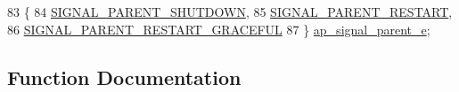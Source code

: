 \begin{DoxyCode}
83              \{
84     \hyperlink{group__APACHE__MPM__WINNT_gga5a7dd40ae0ca72d0a9dcf929d85adca0a764c7dea59a3ddb1626bac2aebe506a8}{SIGNAL\_PARENT\_SHUTDOWN},
85     \hyperlink{group__APACHE__MPM__WINNT_gga5a7dd40ae0ca72d0a9dcf929d85adca0ac6237f0eca6083d8e047fc5e2646b793}{SIGNAL\_PARENT\_RESTART},
86     \hyperlink{group__APACHE__MPM__WINNT_gga5a7dd40ae0ca72d0a9dcf929d85adca0ab70e7e6e4d776154d7b097c9a17e23bc}{SIGNAL\_PARENT\_RESTART\_GRACEFUL}
87 \} \hyperlink{group__APACHE__MPM__WINNT_ga5a7dd40ae0ca72d0a9dcf929d85adca0}{ap\_signal\_parent\_e};
\end{DoxyCode}


\subsection{Function Documentation}
